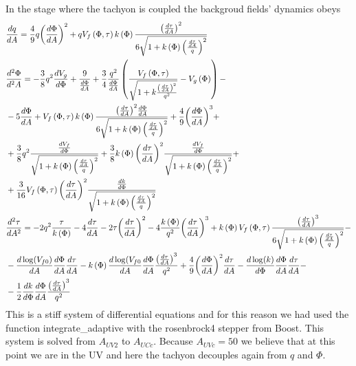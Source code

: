 \documentclass[10 pt]{article}
\begin{document}
In the stage where the tachyon is coupled the backgroud fields' dynamics obeys
\begin{align}
& \frac{dq}{dA} = \frac{4}{9} q {\left(\frac{d\Phi}{dA}\right)}^2 + q V_f \left(\Phi, \tau\right) k\left(\Phi\right) \frac{{\left(\frac{d\tau}{dA}\right)}^2}{6\sqrt{1+ k\left(\Phi\right) {\left(\frac{\frac{d\tau}{dA}}{q}\right)}^2}} \\
& \frac{d^2 \Phi}{d^2A} = - \frac{3}{8} q^2 \frac{d V_g}{d\Phi} + \frac{9}{\frac{d\Phi}{dA}} + \frac{3}{4} \frac{q^2}{\frac{d\Phi}{dA}} \left( \frac{V_f \left(\Phi, \tau\right)}{\sqrt{1+ k \frac{{\left(\frac{d\tau}{dA}\right)}^2}{q^2}}} - V_g \left(\Phi\right) \right) - \\ \notag
& - 5 \frac{d\Phi}{d A} + V_f \left(\Phi, \tau\right) k \left(\Phi\right) \frac{{\left(\frac{d\tau}{dA}\right)}^2 \frac{d\Phi}{dA}}{6 \sqrt{1+ k\left(\Phi\right) {\left(\frac{\frac{d\tau}{dA}}{q}\right)}^2 }} + \frac{4}{9} {\left(\frac{d\Phi}{dA}\right)}^3 + \\ \notag
& + \frac{3}{8} q^2 \frac{\frac{d V_f}{d\Phi}}{\sqrt{1+ k\left(\Phi\right) {\left(\frac{\frac{d\tau}{dA}}{q}\right)}^2}} + \frac{3}{8} k\left(\Phi\right) {\left( \frac{d\tau}{dA}\right)}^2 \frac{\frac{dV_f}{d\Phi}}{\sqrt{1+ k\left(\Phi\right) {\left(\frac{\frac{d\tau}{dA}}{q}\right)}^2}} + \\ \notag
& + \frac{3}{16} V_f\left(\Phi, \tau\right) {\left( \frac{d\tau}{dA}\right)}^2 \frac{\frac{dk}{d \Phi}}{\sqrt{1+ k\left(\Phi\right) {\left(\frac{\frac{d\tau}{dA}}{q}\right)}^2}} \\ \notag
& \frac{d^2 \tau}{d A^2} = -2 q^2 \frac{\tau}{k\left(\Phi\right)} - 4 \frac{d\tau}{d A} -2 \tau {\left(\frac{d\tau}{dA}\right)}^2 - 4\frac{k\left(\Phi\right)}{q^2} {\left(\frac{d\tau}{dA}\right)}^3 + k\left(\Phi\right) V_f \left(\Phi, \tau \right) \frac{{\left(\frac{d\tau}{dA}\right)}^3}{6 \sqrt{1+ k\left(\Phi\right) {\left(\frac{\frac{d\tau}{dA}}{q}\right)}^2}} - \\
& - \frac{d \log(V_{f0})}{dA} \frac{d\Phi}{dA} \frac{d\tau}{dA} - k \left(\Phi\right) \frac{d\log(V_{f0}}{dA} \frac{d\Phi}{dA}\frac{{\left(\frac{d\tau}{d A}\right)}^3}{q^2} + \frac{4}{9} {\left(\frac{d\Phi}{dA}\right)}^2 \frac{d\tau}{dA} - \frac{d \log(k)}{d\Phi} \frac{d\Phi}{dA} \frac{d\tau}{dA} - \\ \notag
& - \frac{1}{2} \frac{d k}{d\Phi} \frac{d\Phi}{dA} \frac{{\left( \frac{d\tau}{dA}\right)}^3}{q^2}
\end{align}
This is a stiff system of differential equations and for this reason we had used the function integrate\_adaptive with the rosenbrock4 stepper from Boost. This system is solved from $A_{UV2}$ to $A_{UCc}$. Because $A_{UVc} = 50$ we believe that at this point we are in the UV and here the tachyon decouples again from $q$ and $\Phi$.
\end{document}
